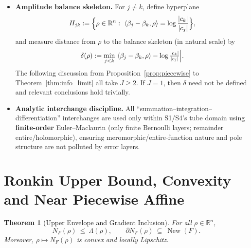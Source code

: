 \documentclass[11pt,a4paper]{article}
\newtheorem{theorem}{Theorem}[section]
\theoremstyle{remark}
\DeclareMathOperator{\New}{New}
\begin{document}
\begin{itemize}
\item \textbf{Amplitude balance skeleton.} For $j\neq k$, define hyperplane
\begin{equation}
H_{jk}:=\Bigl\{\rho\in\mathbb{R}^n:\ \langle\beta_j-\beta_k,\rho\rangle=\log\frac{|c_k|}{|c_j|}\Bigr\},
\end{equation}
and measure distance from $\rho$ to the balance skeleton (in natural scale) by
\begin{equation}
\delta(\rho):=\min_{j<k}\Bigl|\langle\beta_j-\beta_k,\rho\rangle-\log\tfrac{|c_k|}{|c_j|}\Bigr|.
\end{equation}
The following discussion from Proposition~\ref{prop:piecewise} to Theorem~\ref{thm:info_limit} all take $J\ge 2$. If $J=1$, then $\delta$ need not be defined and relevant conclusions hold trivially.

\item \textbf{Analytic interchange discipline.} All ``summation--integration--differentiation'' interchanges are used only within S1/S4's tube domain using \textbf{finite-order} Euler--Maclaurin (only finite Bernoulli layers; remainder entire/holomorphic), ensuring meromorphic/entire-function nature and pole structure are not polluted by error layers.
\end{itemize}

\section{Ronkin Upper Bound, Convexity and Near Piecewise Affine}

\begin{theorem}[Upper Envelope and Gradient Inclusion]\label{thm:upper_envelope}
For all $\rho\in\mathbb{R}^n$,
\begin{equation}
N_F(\rho)\ \le\ \Lambda(\rho),\qquad
\partial N_F(\rho)\ \subseteq\ \New(F).
\end{equation}
Moreover, $\rho\mapsto N_F(\rho)$ is convex and locally Lipschitz.
\end{theorem}
\end{document}
